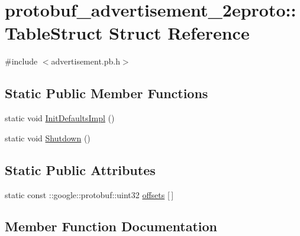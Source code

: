 \hypertarget{structprotobuf__advertisement__2eproto_1_1_table_struct}{}\section{protobuf\+\_\+advertisement\+\_\+2eproto\+:\+:Table\+Struct Struct Reference}
\label{structprotobuf__advertisement__2eproto_1_1_table_struct}


{\ttfamily \#include $<$advertisement.\+pb.\+h$>$}

\subsection*{Static Public Member Functions}
\begin{DoxyCompactItemize}
\item 
static void \hyperlink{structprotobuf__advertisement__2eproto_1_1_table_struct_a69f70876b9af177f54ed8499bc5fcd61}{Init\+Defaults\+Impl} ()
\item 
static void \hyperlink{structprotobuf__advertisement__2eproto_1_1_table_struct_aeaa6fd1b6d696cf5560a006c351666ac}{Shutdown} ()
\end{DoxyCompactItemize}
\subsection*{Static Public Attributes}
\begin{DoxyCompactItemize}
\item 
static const \+::google\+::protobuf\+::uint32 \hyperlink{structprotobuf__advertisement__2eproto_1_1_table_struct_a4126f35a0f4e23e0f9ffee93f1f3a67f}{offsets} \mbox{[}$\,$\mbox{]}
\end{DoxyCompactItemize}


\subsection{Member Function Documentation}
